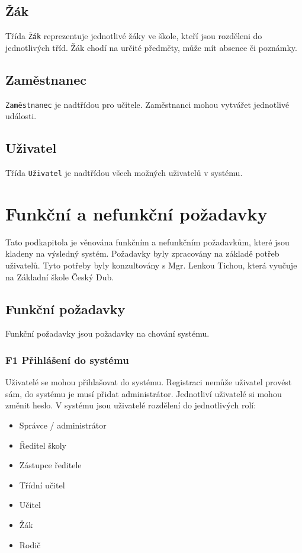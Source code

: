 \subsection{Žák}
Třída \texttt{Žák} reprezentuje jednotlivé žáky ve škole, kteří jsou rozděleni do jednotlivých tříd. Žák chodí na určité předměty, může mít absence či poznámky.
\subsection{Zaměstnanec}
\texttt{Zaměstnanec} je nadtřídou pro učitele. Zaměstnanci mohou vytvářet jednotlivé události.
\subsection{Uživatel}
Třída \texttt{Uživatel} je nadtřídou všech možných uživatelů v systému.


\section{Funkční a nefunkční požadavky}
Tato podkapitola je věnována funkčním a nefunkčním požadavkům, které jsou kladeny na výsledný systém. Požadavky byly zpracovány na základě potřeb uživatelů. Tyto potřeby byly konzultovány s Mgr. Lenkou Tichou, která vyučuje na Základní škole Český Dub.

\subsection{Funkční požadavky}
Funkční požadavky jsou požadavky na chování systému. \cite{funkcni_pozadavky}

\subsubsection*{F1 Přihlášení do systému}
Uživatelé se mohou přihlašovat do systému. Registraci nemůže uživatel provést sám, do systému je musí přidat administrátor. Jednotliví uživatelé si mohou změnit heslo. V systému jsou uživatelé rozdělení do jednotlivých rolí:

\begin{itemize}
    \item Správce / administrátor
    \item Ředitel školy
    \item Zástupce ředitele
    \item Třídní učitel
    \item Učitel
    \item Žák
    \item Rodič
\end{itemize}

